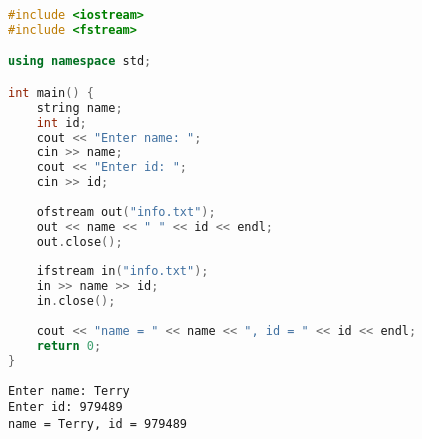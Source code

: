 
\begin{lstlisting}[language=C++]
#include <iostream>
#include <fstream>

using namespace std;

int main() {
    string name;
    int id;
    cout << "Enter name: ";
    cin >> name;
    cout << "Enter id: ";
    cin >> id;
    
    ofstream out("info.txt");
    out << name << " " << id << endl;
    out.close();
    
    ifstream in("info.txt");
    in >> name >> id;
    in.close();
    
    cout << "name = " << name << ", id = " << id << endl;
    return 0;
}
\end{lstlisting}

\begin{tcolorbox}
	\begin{verbatim}
Enter name: Terry
Enter id: 979489
name = Terry, id = 979489
	\end{verbatim}
\end{tcolorbox}

\newpage